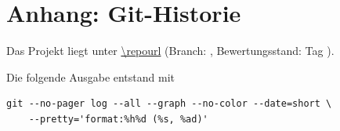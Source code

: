 \clearpage
\section*{Anhang: Git-Historie}

Das Projekt liegt unter \url{\repourl} (Branch: \texttt{\repobranch}, Bewertungsstand: Tag \texttt{\repotag}).

Die folgende Ausgabe entstand mit
\begin{verbatim}
git --no-pager log --all --graph --no-color --date=short \
    --pretty='format:%h%d (%s, %ad)'
\end{verbatim}

{\scriptsize}
